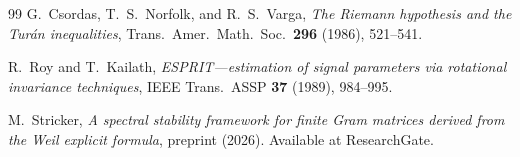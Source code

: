 \documentclass[11pt,a4paper]{article}
\begin{document}
\begin{thebibliography}{99}
G.~Csordas, T.~S.~Norfolk, and R.~S.~Varga,
\emph{The Riemann hypothesis and the Tur\'an inequalities},
Trans.\ Amer.\ Math.\ Soc.\ \textbf{296} (1986), 521--541.

R.~Roy and T.~Kailath,
\emph{ESPRIT---estimation of signal parameters via rotational invariance techniques},
IEEE Trans.\ ASSP \textbf{37} (1989), 984--995.

M.~Stricker,
\emph{A spectral stability framework for finite Gram matrices derived from the Weil explicit formula},
preprint (2026).
Available at ResearchGate.

\end{thebibliography}
\end{document}
